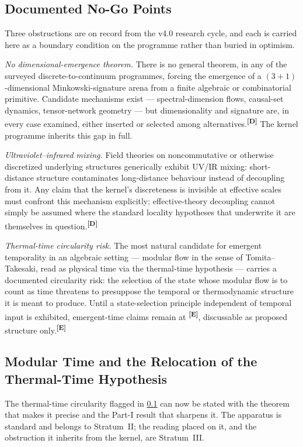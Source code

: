 \documentclass[12pt,a4paper,twoside]{article}
\theoremstyle{plain}
\theoremstyle{definition}
\theoremstyle{remark}
\newcommand{\catmark}[1]{\textsuperscript{\textsf{\textbf{[#1]}}}}
\begin{document}
\subsection{Documented No-Go Points}
\label{subsec:no-go-points}

Three obstructions are on record from the v4.0 research cycle, and each
is carried here as a boundary condition on the programme rather than
buried in optimism.

\emph{No dimensional-emergence theorem.} There is no general theorem, in
any of the surveyed discrete-to-continuum programmes, forcing the
emergence of a $(3{+}1)$-dimensional Minkowski-signature arena from a
finite algebraic or combinatorial primitive. Candidate mechanisms exist
--- spectral-dimension flows, causal-set dynamics, tensor-network
geometry --- but dimensionality and signature are, in every case examined,
either inserted or selected among alternatives.\catmark{D} The kernel
programme inherits this gap in full.

\emph{Ultraviolet--infrared mixing.} Field theories on noncommutative or
otherwise discretized underlying structures generically exhibit
UV/IR mixing: short-distance structure contaminates long-distance
behaviour instead of decoupling from it. Any claim that the kernel's
discreteness is invisible at effective scales must confront this
mechanism explicitly; effective-theory decoupling cannot simply be
assumed where the standard locality hypotheses that underwrite it are
themselves in question.\catmark{D}

\emph{Thermal-time circularity risk.} The most natural candidate for
emergent temporality in an algebraic setting --- modular flow in the
sense of Tomita--Takesaki, read as physical time via the thermal-time
hypothesis --- carries a documented circularity risk: the selection of
the state whose modular flow is to count as time threatens to presuppose
the temporal or thermodynamic structure it is meant to produce. Until a
state-selection principle independent of temporal input is exhibited,
emergent-time claims remain at \catmark{E}, discussable as proposed
structure only.\catmark{E}

\subsection{Modular Time and the Relocation of the Thermal-Time Hypothesis}
\label{subsec:modular-time}

The thermal-time circularity flagged in \cref{subsec:no-go-points} can now
be stated with the theorem that makes it precise and the Part-I result that
sharpens it. The apparatus is standard and belongs to Stratum~II; the
reading placed on it, and the obstruction it inherits from the kernel, are
Stratum~III.
\end{document}
